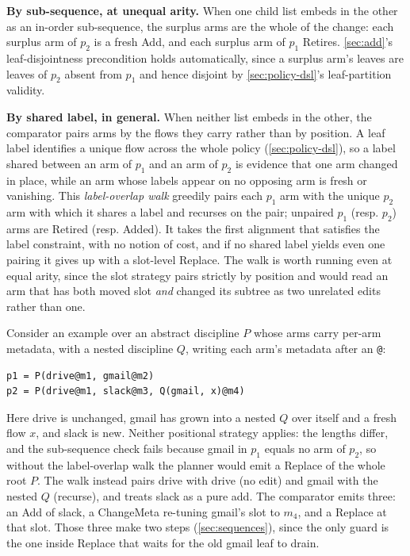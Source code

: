 \documentclass[sigplan,anonymous,review,nonacm]{acmart}
\newcommand{\Add}{\textsf{Add}}
\newcommand{\ChangeMeta}{\textsf{ChangeMeta}}
\newcommand{\Retire}{\textsf{Retire}}
\newcommand{\Replace}{\textsf{Replace}}
\begin{document}
\textbf{By sub-sequence, at unequal arity.}
When one child list embeds in the other as an in-order sub-sequence, the surplus arms are the whole of the change: each surplus arm of \(p_2\) is a fresh \Add{}, and each surplus arm of \(p_1\) \Retire{}s.
\cref{sec:add}'s leaf-disjointness precondition holds automatically, since a surplus arm's leaves are leaves of \(p_2\) absent from \(p_1\) and hence disjoint by \cref{sec:policy-dsl}'s leaf-partition validity.

\textbf{By shared label, in general.}
When neither list embeds in the other, the comparator pairs arms by the flows they carry rather than by position.
A leaf label identifies a unique flow across the whole policy (\cref{sec:policy-dsl}), so a label shared between an arm of \(p_1\) and an arm of \(p_2\) is evidence that one arm changed in place, while an arm whose labels appear on no opposing arm is fresh or vanishing.
This \emph{label-overlap walk} greedily pairs each \(p_1\) arm with the unique \(p_2\) arm with which it shares a label and recurses on the pair; unpaired \(p_1\) (resp. \(p_2\)) arms are \Retire{}d (resp. \Add{}ed).
It takes the first alignment that satisfies the label constraint, with no notion of cost, and if no shared label yields even one pairing it gives up with a slot-level \Replace{}.
The walk is worth running even at equal arity, since the slot strategy pairs strictly by position and would read an arm that has both moved slot \emph{and} changed its subtree as two unrelated edits rather than one.

Consider an example over an abstract discipline \(P\) whose arms carry per-arm metadata, with a nested discipline \(Q\), writing each arm's metadata after an \texttt{@}:

\begin{verbatim}
p1 = P(drive@m1, gmail@m2)
p2 = P(drive@m1, slack@m3, Q(gmail, x)@m4)
\end{verbatim}

Here \textsf{drive} is unchanged, \textsf{gmail} has grown into a nested \(Q\) over itself and a fresh flow \(x\), and \textsf{slack} is new.
Neither positional strategy applies: the lengths differ, and the sub-sequence check fails because \textsf{gmail} in \(p_1\) equals no arm of \(p_2\), so without the label-overlap walk the planner would emit a \Replace{} of the whole root \(P\).
The walk instead pairs \textsf{drive} with \textsf{drive} (no edit) and \textsf{gmail} with the nested \(Q\) (recurse), and treats \textsf{slack} as a pure add.
The comparator emits three: an \Add{} of \textsf{slack}, a \ChangeMeta{} re-tuning \textsf{gmail}'s slot to \(m_4\), and a \Replace{} at that slot.
Those three make two steps (\cref{sec:sequences}), since the only guard is the one inside \Replace{} that waits for the old \textsf{gmail} leaf to drain.
\end{document}
